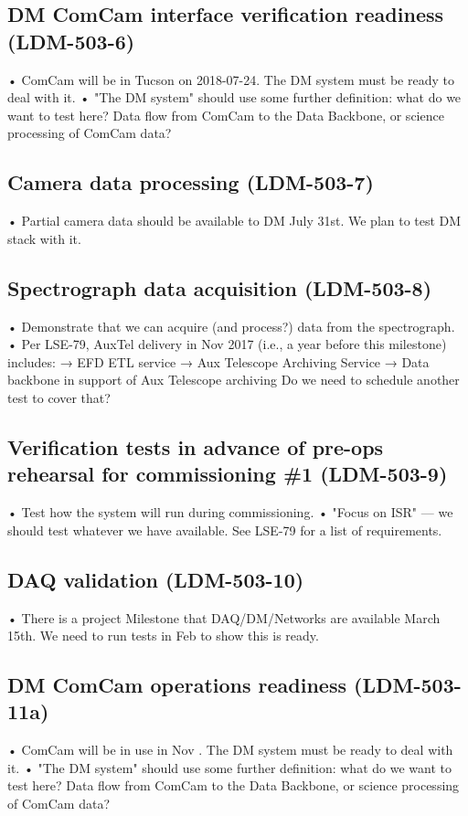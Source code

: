 \subsection{ DM ComCam interface verification readiness \textbf{(LDM-503-6)}\label{LDM-503-6}}
• ComCam will be in Tucson on 2018-07-24. The DM system must be ready to deal with it.
 \newline• "The DM system" should use some further definition: what do we want to test here? Data flow from ComCam to the Data Backbone, or science processing of ComCam data?
\subsection{ Camera data processing \textbf{(LDM-503-7)}\label{LDM-503-7}}
• Partial camera data should be available to DM July 31st. We plan to test DM stack with it.
 \newline
\subsection{ Spectrograph data acquisition \textbf{(LDM-503-8)}\label{LDM-503-8}}
• Demonstrate that we can acquire (and process?) data from the spectrograph.
 \newline• Per LSE-79, AuxTel delivery in Nov 2017 (i.e., a year before this milestone) includes: → EFD ETL service → Aux Telescope Archiving Service → Data backbone in support of Aux Telescope archiving Do we need to schedule another test to cover that?
\subsection{Verification tests in advance of pre-ops rehearsal for commissioning \#1 \textbf{(LDM-503-9)}\label{LDM-503-9}}
• Test how the system will run during commissioning.
 \newline• "Focus on ISR" — we should test whatever we have available. See LSE-79 for a list of requirements.
\subsection{ DAQ validation \textbf{(LDM-503-10)}\label{LDM-503-10}}
• There is a project Milestone that DAQ/DM/Networks are available March 15th. We need to run tests in Feb to show this is ready.
 \newline
\subsection{ DM ComCam operations readiness \textbf{(LDM-503-11a)}\label{LDM-503-11a}}
• ComCam will be in use in Nov . The DM system must be ready to deal with it.
 \newline• "The DM system" should use some further definition: what do we want to test here? Data flow from ComCam to the Data Backbone, or science processing of ComCam data?
